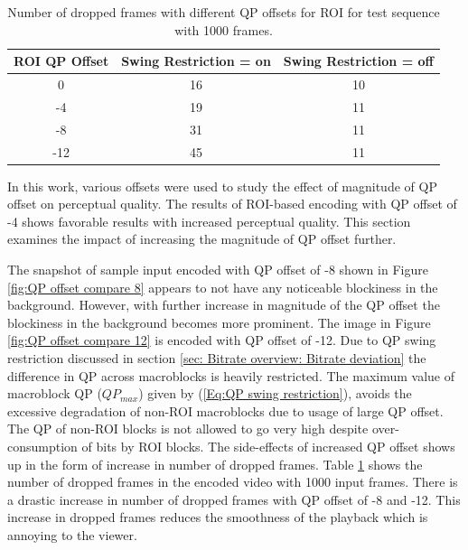 \documentclass[11pt]{article} %
\begin{document}
\begin{table} [h!]
	\centering
	\begin{tabular}{ |c|c|c| }
		\hline
		\textbf{ROI QP Offset} & \textbf{Swing Restriction = on} & \textbf{Swing Restriction = off} \\
		\hline 
		0 & 16 & 10  \\
		\hline
		-4 & 19 & 11  \\
		\hline
		-8 & 31 & 11 \\ 
		\hline
		-12 & 45 & 11 \\ 
		\hline						
	\end{tabular}
	\caption{Number of dropped frames with different QP offsets for ROI for test sequence with 1000 frames.}
	\label{Table:QP tuning dropped frames}
\end{table}

In this work, various offsets were used to study the effect of magnitude of QP offset on perceptual quality. The results of ROI-based encoding with QP offset of -4 shows favorable results with increased perceptual quality. This section examines the impact of increasing the magnitude of QP offset further. %

The snapshot of sample input encoded  with QP offset of -8 shown in Figure \ref{fig:QP offset compare 8} appears to not have any noticeable blockiness in the background. However, with further increase in magnitude of the QP offset the blockiness in the background becomes more prominent. The image in Figure \ref{fig:QP offset compare 12} is encoded with QP offset of -12. Due to QP swing restriction discussed in section \ref{sec: Bitrate overview: Bitrate deviation} the difference in QP across macroblocks is heavily restricted. The maximum value of macroblock QP ($QP_{max}$) given by (\ref{Eq:QP swing restriction}), avoids the excessive degradation of non-ROI macroblocks due to usage of large QP offset. The QP of non-ROI blocks is not allowed to go very high despite over-consumption of bits by ROI blocks.  The side-effects of increased QP offset shows up in the form of increase in number of dropped frames. Table \ref{Table:QP tuning dropped frames} shows the number of dropped frames in the encoded video with 1000 input frames. There is a drastic increase in number of dropped frames with QP offset of -8 and -12. This increase in dropped frames reduces the smoothness of the playback which is annoying to the viewer.
\end{document}
